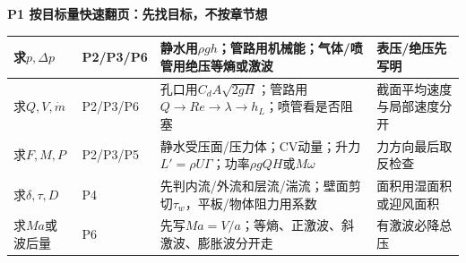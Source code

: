 \documentclass[UTF8,a4paper]{ctexart}
\newcommand{\ftitle}[1]{\vspace{1pt}\textbf{\textcolor{B}{#1}}\par\vspace{0.5pt}}
\begin{document}
\ftitle{P1 按目标量快速翻页：先找目标，不按章节想}
\begin{tabular}{|L{0.14\textwidth}|L{0.18\textwidth}|L{0.44\textwidth}|L{0.19\textwidth}|}\hline
求$p,\Delta p$ & P2/P3/P6 & 静水用$\rho gh$；管路用机械能；气体/喷管用绝压等熵或激波 & 表压/绝压先写明\\\hline
求$Q,V,\dot m$ & P2/P3/P6 & 孔口用$C_dA\sqrt{2gH}$；管路用$Q\to Re\to\lambda\to h_L$；喷管看是否阻塞 & 截面平均速度与局部速度分开\\\hline
求$F,M,P$ & P2/P3/P5 & 静水受压面/压力体；CV动量；升力$L'=\rho U\Gamma$；功率$\rho gQH$或$M\omega$ & 力方向最后取反检查\\\hline
求$\delta,\tau,D$ & P4 & 先判内流/外流和层流/湍流；壁面剪切$\tau_w$，平板/物体阻力用系数 & 面积用湿面积或迎风面积\\\hline
求$Ma$或波后量 & P6 & 先写$Ma=V/a$；等熵、正激波、斜激波、膨胀波分开走 & 有激波必降总压\\\hline
\end{tabular}
\newpage
\end{document}
